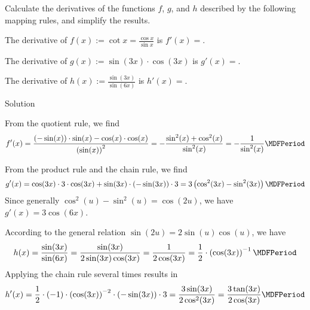 \begin{MExercises}
\begin{MExercise}
Calculate the derivatives of the functions $f$, $g$, and $h$ described by the following mapping rules, and simplify
the results.
\begin{MExerciseItems}
\item The derivative of $f(x) := \cot x = \frac{\cos x}{\sin x}$
is $f'(x) = $.
%
\item The derivative of $g(x) := \sin(3 x) \cdot \cos(3 x)$
is $g'(x) = $.
%
\item The derivative of $h(x) := \frac{\sin(3 x)}{\sin(6 x)}$
is $h'(x) = $.
\end{MExerciseItems}
\begin{MHint}{Solution}
 \begin{MExerciseItems}
  \item From the quotient rule, we find
  \[
  f'(x) = \frac{(- \sin (x)) \cdot \sin (x) - \cos (x) \cdot \cos (x)}{\left( \sin (x) \right)^2}
  = - \frac{\sin^2 (x) + \cos^2 (x)}{\sin^2 (x)} = - \frac{1}{\sin^2 (x)} \MDFPeriod
  \]
  \item From the product rule and the chain rule, we find
  \[
   g'(x) = \cos (3x) \cdot 3 \cdot \cos (3x) + \sin (3x) \cdot \left( - \sin (3x) \right) \cdot 3
   = 3 \left( \cos^2 (3x) - \sin^2 (3x) \right) \MDFPeriod
  \]
  Since generally $\cos^2 (u) - \sin^2 (u) = \cos (2u)$, we have $g'(x) = 3 \cos (6x)$.
  \item According to the general relation $\sin (2u) = 2 \sin(u) \cos(u)$, we have
  \[
  h(x) = \frac{\sin (3x)}{\sin (6x)} = \frac{\sin (3x)}{2 \sin (3x) \cos (3x)} = \frac{1}{2 \cos (3x)}
  = \frac12 \cdot \left( \cos (3x) \right)^{-1} \MDFPeriod
  \]
    Applying the chain rule several times results in
  \[
  h'(x) = \frac12 \cdot (-1) \cdot \left( \cos (3x) \right)^{-2} \cdot \left( - \sin (3x) \right) \cdot 3
  = \frac{3 \sin (3x)}{2 \cos^2 (3x)} = \frac{3 \tan (3x)}{2 \cos (3x)} \MDFPeriod
  \]
 \end{MExerciseItems}
\end{MHint}
\end{MExercise}


\end{MExercises}
